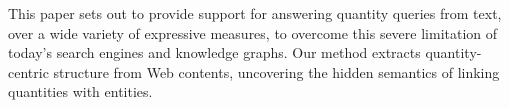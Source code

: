 



This paper sets out to provide support for answering quantity queries from text, over a wide variety of expressive measures, to overcome
this severe limitation of today's search engines and knowledge graphs.
Our method extracts quantity-centric structure from Web contents, uncovering the hidden semantics
of linking quantities with entities. 




